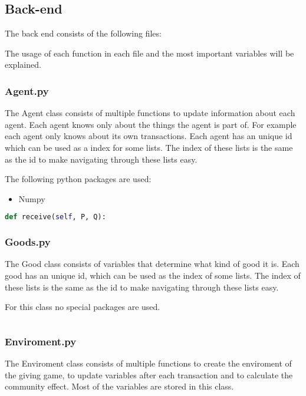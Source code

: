 \documentclass{article}
\begin{document}
\subsection{Back-end}
The back end consists of the following files:

The usage of each function in each file and the most important variables will be explained.

\subsubsection{Agent.py}
The Agent class consists of multiple functions to update information about each agent. Each agent knows only about the things the agent is part of. For example each agent only knows about its own transactions. Each agent has an unique id which can be used as a index for some lists. The index of these lists is the same as the id to make navigating through these lists easy.

The following python packages are used:
\begin{itemize}
  \item Numpy
\end{itemize}


\begin{lstlisting}[language=Python]
def receive(self, P, Q):
\end{lstlisting}

\subsubsection{Goods.py}
The Good class consists of variables that determine what kind of good it is. Each good has an unique id, which can be used as the index of some lists. The index of these lists is the same as the id to make navigating through these lists easy.

For this class no special packages are used.

\begin{lstlisting}[language=Python]

\end{lstlisting}

\subsubsection{Enviroment.py}
The Enviroment class consists of multiple functions to create the enviroment of the giving game, to update variables after each transaction and to calculate the community effect. Most of the variables are stored in this class.
\end{document}
